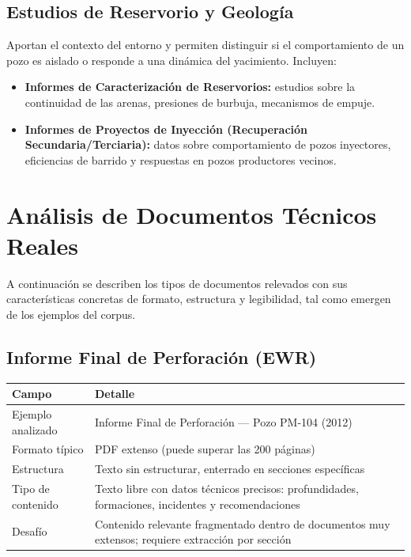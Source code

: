 \documentclass[12pt, a4paper]{article}
\begin{document}
\subsection{Estudios de Reservorio y Geolog\'{i}a}

Aportan el contexto del entorno y permiten distinguir si el comportamiento de un pozo es
aislado o responde a una din\'{a}mica del yacimiento. Incluyen:

\begin{itemize}
  \item \textbf{Informes de Caracterizaci\'{o}n de Reservorios:} estudios sobre la
        continuidad de las arenas, presiones de burbuja, mecanismos de empuje.
  \item \textbf{Informes de Proyectos de Inyecci\'{o}n (Recuperaci\'{o}n Secundaria/Terciaria):}
        datos sobre comportamiento de pozos inyectores, eficiencias de barrido y respuestas en
        pozos productores vecinos.
\end{itemize}

\section{An\'{a}lisis de Documentos T\'{e}cnicos Reales}

A continuaci\'{o}n se describen los tipos de documentos relevados con sus caracter\'{i}sticas
concretas de formato, estructura y legibilidad, tal como emergen de los ejemplos del corpus.

\subsection{Informe Final de Perforaci\'{o}n (EWR)}

\begin{tabularx}{\textwidth}{BL}
  \toprule
  \textbf{Campo} & \textbf{Detalle} \\
  \midrule
  Ejemplo analizado   & Informe Final de Perforaci\'{o}n --- Pozo PM-104 (2012) \\
  \addlinespace
  Formato t\'{i}pico  & PDF extenso (puede superar las 200 p\'{a}ginas) \\
  \addlinespace
  Estructura          & Texto sin estructurar, enterrado en secciones espec\'{i}ficas \\
  \addlinespace
  Tipo de contenido   & Texto libre con datos t\'{e}cnicos precisos: profundidades, formaciones,
                        incidentes y recomendaciones \\
  \addlinespace
  Desaf\'{i}o         & Contenido relevante fragmentado dentro de documentos muy extensos;
                        requiere extracci\'{o}n por secci\'{o}n \\
  \bottomrule
\end{tabularx}
\end{document}

